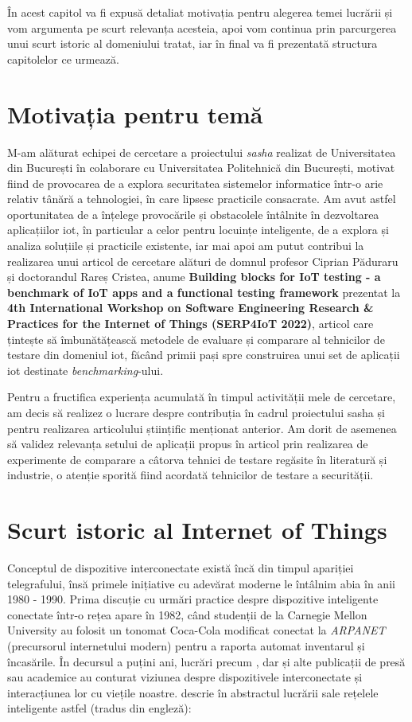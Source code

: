 În acest capitol va fi expusă detaliat motivația pentru alegerea temei lucrării și vom argumenta pe scurt relevanța acesteia, apoi vom continua prin parcurgerea unui scurt istoric al domeniului tratat, iar în final va fi prezentată structura capitolelor ce urmează.

\section{Motivația pentru temă}

M-am alăturat echipei de cercetare a proiectului \textit{\acrfull{sasha}} realizat de Universitatea din București în colaborare cu Universitatea Politehnică din București, motivat fiind de provocarea de a explora securitatea sistemelor informatice într-o arie relativ tânără a tehnologiei, în care lipsesc practicile consacrate. Am avut astfel oportunitatea de a înțelege provocările și obstacolele întâlnite în dezvoltarea aplicațiilor \acrshort{iot}, în particular a celor pentru locuințe inteligente, de a explora și analiza soluțiile și practicile existente, iar mai apoi am putut contribui la realizarea unui articol de cercetare alături de domnul profesor Ciprian Păduraru și doctorandul Rareș Cristea, anume \textbf{Building blocks for IoT testing - a benchmark of IoT apps and a functional testing framework} prezentat la \textbf{4th International Workshop on Software Engineering Research \& Practices for the Internet of Things (SERP4IoT 2022)}, articol care țintește să îmbunătățească metodele de evaluare și comparare al tehnicilor de testare din domeniul \acrlong{iot}, făcând primii pași spre construirea unui set de aplicații \acrshort{iot} destinate \textit{benchmarking}-ului.

Pentru a fructifica experiența acumulată în timpul activității mele de cercetare, am decis să realizez o lucrare despre contribuția în cadrul proiectului \acrshort{sasha} și pentru realizarea articolului științific menționat anterior. Am dorit de asemenea să validez relevanța setului de aplicații propus în articol prin realizarea de experimente de comparare a câtorva tehnici de testare regăsite în literatură și industrie, o atenție sporită fiind acordată tehnicilor de testare a securității.

\section{Scurt istoric al Internet of Things}

Conceptul de dispozitive interconectate există încă din timpul apariției telegrafului, însă primele inițiative cu adevărat moderne le întâlnim abia în anii 1980 - 1990. Prima discuție cu urmări practice despre dispozitive inteligente conectate într-o rețea apare în 1982, când studenții de la  Carnegie Mellon University au folosit un tonomat Coca-Cola modificat conectat la \textit{ARPANET} (precursorul internetului modern) pentru a raporta automat inventarul și încasările. În decursul a puțini ani, lucrări precum \cite{Weiser1999}, dar și alte publicații de presă sau academice au conturat viziunea despre dispozitivele interconectate și interacțiunea lor cu viețile noastre. \cite{Raji1994} descrie în abstractul lucrării sale rețelele inteligente astfel (tradus din engleză):


